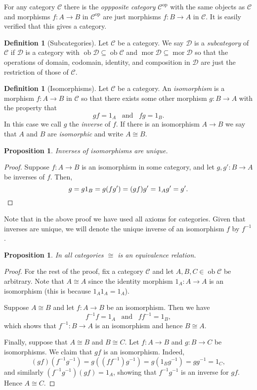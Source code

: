 \documentclass{report}
\DeclareMathOperator{\ob}{ob}
\DeclareMathOperator{\mor}{mor}
\theoremstyle{definition}
\theoremstyle{plain}
\newtheorem{prop}[thm]{Proposition}
\theoremstyle{definition}
\newtheorem{defn}[thm]{Definition}
\begin{document}
	For any category $\mathcal{C}$ there is the \emph{oppposite category} $\mathcal{C}^{\text{op}}$ with the same objects as $\mathcal{C}$ and morphisms $f\colon A\to B$ in $\mathcal{C}^{\text{op}}$ are just morphisms $f\colon B \to A$ in $\mathcal{C}$. It is easily verified that this gives a category. 
	\begin{defn}[Subcategories]
		Let $\mathcal{C}$ be a category. We say $\mathcal{D}$ is a \emph{subcategory} of $\mathcal{C}$ if $\mathcal{D}$ is a category with $\ob \mathcal{D} \subseteq \ob \mathcal{C}$ and $\mor \mathcal{D}\subseteq \mor \mathcal{D}$ so that the operations of domain, codomain, identity, and composition in $\mathcal{D}$ are just the restriction of those of $\mathcal{C}$.
	\end{defn}
	\begin{defn}[Isomorphisms]
		Let $\mathcal{C}$ be a category. An \emph{isomorphism} is a morphism $f\colon A \to B$ in $\mathcal{C}$ so that there exists some other morphism $g\colon B \to A$ with the property that 
		\[
			gf = 1_A \,\,\,\text{ and }\,\,\, fg= 1_B.
		\]
		In this case we call $g$ the \emph{inverse} of $f$. If there is an isomorphism $A\to B$ we say that $A$ and $B$ are \emph{isomorphic} and write $A\cong B$.
	\end{defn}
	\begin{prop}
		Inverses of isomorphisms are unique.
	\end{prop}
	\begin{proof}
		Suppose $f\colon A \to B$ is an isomorphism in some category, and let $g,g'\colon B \to A$ be inverses of $f$. Then,
		\[
			g = g1_B = g(fg') = (gf)g' = 1_Ag' = g'.\qedhere
		\]
	\end{proof}
	Note that in the above proof we have used all axioms for categories. Given that inverses are unique, we will denote the unique inverse of an isomorphism $f$ by $f^{-1}$.
	\begin{prop}
		In all categories $\cong$ is an equivalence relation.
	\end{prop}
	\begin{proof}
		For the rest of the proof, fix a category $\mathcal{C}$ and let $A,B,C\in \ob \mathcal{C}$ be arbitrary. Note that $A\cong A$ since the identity morphism $1_A \colon A \to A$ is an isomorphism (this is because $1_A1_A = 1_A$).
		
		Suppose $A\cong B$ and let $f\colon A \to B$ be an isomorphism. Then we have
		\[
			f^{-1}f = 1_A \,\,\,\text{ and }\,\,\, ff^{-1}= 1_B,
		\]
		which shows that $f^{-1}\colon B \to A$ is an isomorphism and hence $B\cong A$.
		
		Finally, suppose that $A\cong B$ and $B\cong C$. Let $f\colon A \to B$ and $g\colon B \to C$ be isomorphisms. We claim that $gf$ is an isomorphism. Indeed, 
		\[
			(gf)(f^{-1}g^{-1}) = g((ff^{-1})g^{-1}) = g(1_Bg^{-1}) = gg^{-1} = 1_C,
		\]
		and similarly $(f^{-1}g^{-1})(gf) = 1_A$, showing that $f^{-1}g^{-1}$ is an inverse for $gf$. Hence $A\cong C$.
	\end{proof}
\end{document}
